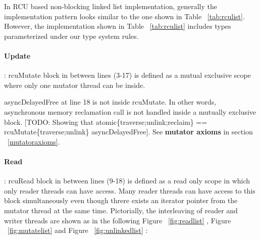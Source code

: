 \documentclass{article}
\begin{document}
In RCU based non-blocking linked list implementation, generally the implementation pattern looks similar to the one shown in Table ~\ref{tab:rculist}. However, the implementation shown in Table ~\ref{tab:rculist} includes types parameterized under our type system rules.
\paragraph{Update}  : \textsf{rcuMutate} block in between lines (3-17) is defined as  a mutual exclusive scope where only one mutator thread can be inside. 

\textsf{asyncDelayedFree} at line 18 is not inside \textsf{rcuMutate}. In other words, asynchronous memory reclamation call is not handled inside a mutually exclusive block.  [TODO: Showing that atomic\{traverse;unlink;reclaim\} == rcuMutate\{traverse;unlink\} asyncDelayedFree]. See \textbf{mutator axioms} in section  ~\ref{mutatoraxioms}.

\paragraph{Read} : \textsf{rcuRead} block in between lines (9-18) is defined as a read only scope in which only reader threads can have access. Many reader threads can have access to this block simultaneously even though threre exists an iterator pointer from the mutator thread at the same time.  Pictorially, the interleaving of reader and writer threads are shown as in the following Figure ~\ref{fig:readlist} , Figure ~\ref{fig:mutatelist} and Figure ~\ref{fig:unlinkedlist} : 
\end{document}

